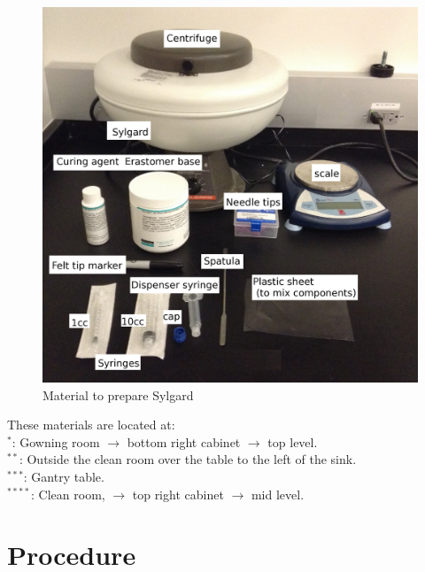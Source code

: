 \documentclass[12pt]{unlsilabsop}
\begin{document}
\begin{figure}[ht]
    \begin{center}
        \includegraphics[scale= 0.3]{img/potting_materials.jpg}
        \caption{Material to prepare Sylgard}
        \label{fig:pottingmaterial}
    \end{center}
\end{figure}

These materials are located at: \\
$^*$: Gowning room $\to$ bottom right cabinet $\to$ top level.\\
$^{**}$: Outside the clean room over the table to the left of the sink.\\ 
$^{***}$: Gantry table. \\
$^{****}$: Clean room, $\to$ top right cabinet $\to$ mid level.\\  

\section{Procedure}
\end{document}

